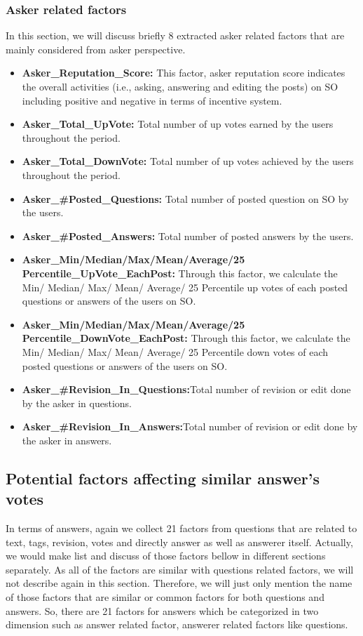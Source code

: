 \documentclass[conference]{IEEEtran}
\begin{document}
	\subsubsection{Asker related factors}\label{AF}
	In this section, we will discuss briefly 8 extracted asker related factors that are mainly considered from asker perspective.
	\begin{itemize}
		\item \textbf{Asker\_Reputation\_Score: } This factor, asker reputation score indicates the overall activities (i.e., asking, answering and editing the posts) on SO including positive and negative in terms of incentive system. 
		\item \textbf{Asker\_Total\_UpVote: } Total number of up votes earned by the users throughout the period.
		\item \textbf{Asker\_Total\_DownVote: } Total number of up votes achieved by the users throughout the period.
		\item \textbf{Asker\_\#Posted\_Questions: }Total number of posted question on SO by the users.
		\item \textbf{Asker\_\#Posted\_Answers: } Total number of posted answers by the users.  
		\item \textbf{Asker\_Min/Median/Max/Mean/Average/25 Percentile\_UpVote\_EachPost:} Through this factor, we calculate the  Min/ Median/ Max/ Mean/ Average/ 25 Percentile up votes of each posted questions or answers of the users on SO.
		\item \textbf{Asker\_Min/Median/Max/Mean/Average/25 Percentile\_DownVote\_EachPost:} Through this factor, we calculate the  Min/ Median/ Max/ Mean/ Average/ 25 Percentile down votes of each posted questions or answers of the users on SO.
		\item \textbf{Asker\_\#Revision\_In\_Questions:}Total number of revision or edit done by the asker in questions.
		\item \textbf{Asker\_\#Revision\_In\_Answers:}Total number of revision or edit done by the asker in answers.
	\end{itemize}


\subsection{Potential factors affecting similar answer's votes}
In terms of answers, again we collect 21 factors from questions that are related to text, tags, revision, votes and directly answer as well as answerer itself.  Actually, we would make list and discuss of those factors bellow in different sections separately. As all of the factors are similar with questions related factors, we will not describe again in this section. Therefore, we will just only mention the name of those factors that are similar or common factors for both questions and answers. So, there are 21 factors for answers which be categorized in two dimension such as answer related factor, answerer related factors like questions. 
\end{document}
